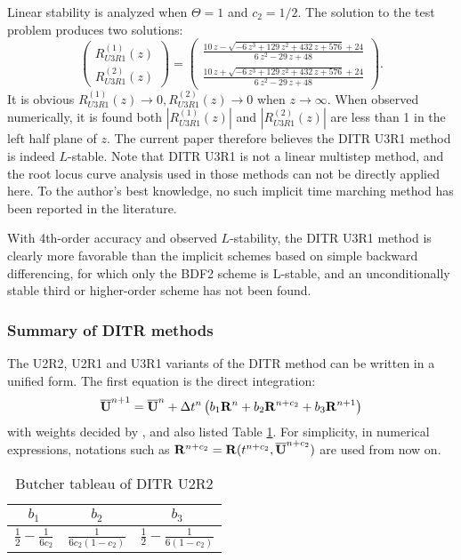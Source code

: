 Linear stability is analyzed when $\Theta =1$ and $c_2 = 1/2$.
The solution to the test problem
produces two solutions:
\begin{equation}
    \left(
    \begin{matrix}
        R_{U3R1}^{(1)}(z) \\
        R_{U3R1}^{(2)}(z)
    \end{matrix}
    \right)=\left(\begin{array}{c} \frac{10\,z-\sqrt{-6\,z^3+129\,z^2+432\,z+576}+24}{6\,z^2-29\,z+48}\\ \frac{10\,z+\sqrt{-6\,z^3+129\,z^2+432\,z+576}+24}{6\,z^2-29\,z+48} \end{array}\right)
    .
\end{equation}
It is obvious $R_{U3R1}^{(1)}(z)\rightarrow 0, R_{U3R1}^{(2)}(z)\rightarrow0$ when
$z\rightarrow\infty$.
When observed numerically, it is found both $|R_{U3R1}^{(1)}(z)|$
and $|R_{U3R1}^{(2)}(z)|$ are less than 1 in the left
half plane of $z$.
The current paper therefore believes %
the DITR U3R1 method is indeed $L$-stable.
Note that DITR U3R1 is not a linear multistep method,
and the root locus curve analysis used in those methods
can not be directly applied here.
To the author's best knowledge, no
such implicit time marching method
has been reported in the literature.

With 4th-order accuracy and observed $L$-stability, the
DITR U3R1 method is clearly more favorable than
the implicit schemes based on 
simple backward differencing, 
for which only the BDF2 scheme is L-stable, 
and an unconditionally stable third 
or higher-order scheme has not been found.

\subsubsection{Summary of DITR methods}
\label{sssec:sumDITRs}

The U2R2, U2R1 and U3R1 variants of the
DITR method can be written in a unified form.
The first equation is the direct integration:
\begin{equation}
    \overline{\mathbf{U}}^{n+1} = \overline{\mathbf{U}}^{n} + {\Delta} t^n\left(
    b_1 \mathbf{R}^n +
    b_2 \mathbf{R}^{n+c_2} +
    b_3 \mathbf{R}^{n+1}
    \right)
    \label{eq:DISum}
\end{equation}
with weights decided by ,
and also listed Table \ref{tab:integ0Tab}.
For simplicity, in numerical expressions,
notations such as $\mathbf{R}^{n+c_2}=\mathbf{R}(t^{n+c_2}, \overline{\mathbf{U}}^{n+c_2})$
are used from now on.
\begin{table}[htbp]
    \centering
    \begin{tabular}{|c|c|c|}
        \hline
        $b_1$                            & $b_2$ & $b_3$ \\
        \hline
        $\frac{1}{2} - \frac{1}{6{c_2}}$ &
        $\frac{1}{6{c_2}(1-{c_2})}$      &
        $\frac{1}{2} - \frac{1}{6(1-{c_2})} $            \\
        \hline
    \end{tabular}
    \caption{Butcher tableau of DITR U2R2}
    \label{tab:integ0Tab}
\end{table}

